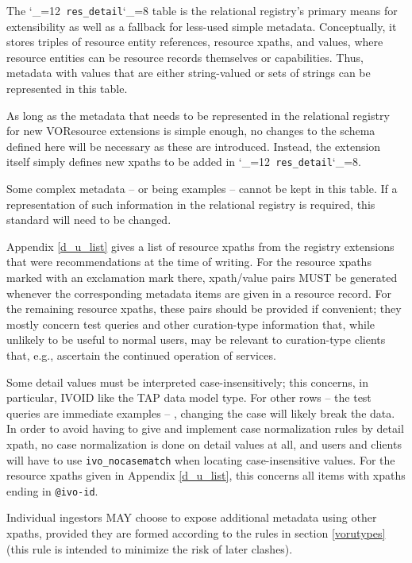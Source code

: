 \documentclass[11pt,a4paper]{ivoa}
\makeatletter
\def\rtent#1{\texttt{\color{rtcolor}\verb|#1|}}
\def\makeunderscoreletter{\catcode`\_=12}
\def\makeunderscoresubscript{\catcode`\_=8}
\def\rtent{\makeunderscoreletter\relax\rt@nt}
\def\rt@nt#1{\texttt{\color{rtcolor} #1}\makeunderscoresubscript{}}
\makeatother
\begin{document}
The \rtent{res_detail} table is the relational registry's primary means for
extensibility as well as a fallback for less-used simple
metadata.  Conceptually, it stores triples of resource entity
references, resource xpaths,
and values, where resource entities can be resource records themselves
or capabilities.  Thus, metadata with values that are either
string-valued or sets of strings can be represented in this table.

As long as the metadata that needs to be represented in the
relational registry for new VOResource extensions is simple enough, no changes to the schema defined
here will be necessary as these are introduced.  Instead, the extension itself simply defines
new xpaths to be added in \rtent{res_detail}.

Some complex metadata --  or
 being examples -- cannot be kept in this table.
If a representation of such information in the relational registry is
required, this standard will need to be changed.

Appendix \ref{d_u_list} gives a list
of resource xpaths from the registry extensions
that were recommendations at the time of writing.
For the resource xpaths marked with an exclamation mark there,
xpath/value pairs MUST be generated whenever the corresponding
metadata items are given in a resource record.
For the remaining resource xpaths, these pairs should be provided if
convenient; they mostly concern test queries and other curation-type
information that, while unlikely to be useful to normal users, may be
relevant to curation-type clients that, e.g., ascertain the continued
operation of services.

Some detail values must be interpreted case-insensitively; this
concerns, in particular, IVOID like the TAP data model type.  For other
rows -- the test queries are immediate examples -- , changing the case
will likely break the data.  In order to avoid having to give and
implement case normalization rules by detail xpath, no case normalization
is done on detail values at all, and users and clients will have to use
\verb|ivo_nocasematch| when locating
case-insensitive values.  For the resource xpaths given in Appendix \ref{d_u_list}, this concerns all items with xpaths ending
in \texttt{@ivo-id}.

Individual
ingestors
MAY choose to expose additional metadata using other xpaths, provided
they are formed according to the rules in
section \ref{vorutypes} (this rule is intended
to minimize the risk of later clashes).
\end{document}
